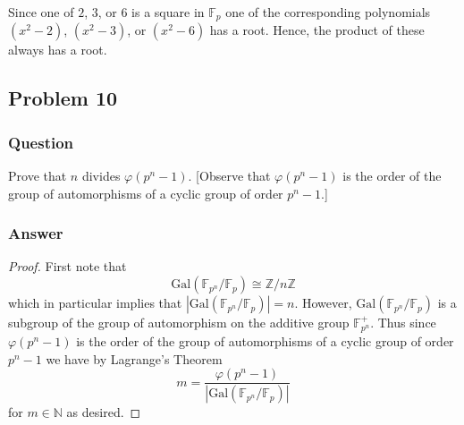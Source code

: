 \documentclass[10pt]{article}
\begin{document}
Since one of $2$, $3$, or $6$ is a square in $\mathbb{F}_p$ one of the corresponding polynomials $(x^2-2)$, $(x^2-3)$, or $(x^2-6)$ has a root. Hence, the product of these always has a root.

\subsection{Problem 10}
\subsubsection{Question}
Prove that $n$ divides $\varphi(p^n-1)$. [Observe that $\varphi(p^n-1)$ is the order of the group of automorphisms of a cyclic group of order $p^n-1$.]
\subsubsection{Answer}
\begin{proof}
First note that
\[\mathrm{Gal}(\mathbb{F}_{p^n}/\mathbb{F}_{p})\cong \mathbb{Z}/n \mathbb{Z} \]
which in particular implies that $|\mathrm{Gal}(\mathbb{F}_{p^n}/\mathbb{F}_{p})|  =n$. However, $\mathrm{Gal}(\mathbb{F}_{p^n}/\mathbb{F}_{p})$ is a subgroup of the group of automorphism on the additive group $\mathbb{F}_{p^n}^+$. Thus since $\varphi(p^n-1)$ is the order of the group of automorphisms of a cyclic group of order $p^n-1$ we have by Lagrange's Theorem
\[m  = \frac{ \varphi(p^n-1) }{|\mathrm{Gal}(\mathbb{F}_{p^n}/\mathbb{F}_{p})| }\]
for $m \in \mathbb{N}$ as desired.\end{proof}
\end{document}
